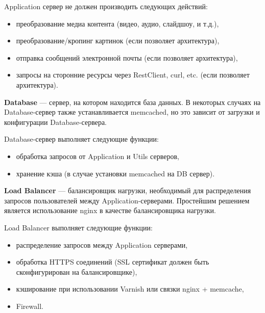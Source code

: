 \documentclass[10pt, a5paper]{article}
\begin{document}
Application сервер не должен производить следующих действий:
\begin{itemize}
\item преобразование медиа контента (видео, аудио, слайдшоу, и т.д.),
\item преобразование/кропинг картинок (если позволяет архитектура),
\item отправка сообщений электронной почты (если позволяет архитектура),
\item запросы на сторонние ресурсы через RestClient, curl, etc. (если позволяет архитектура).
\end{itemize}
{\bf Database} --- сервер, на котором находится база данных. В некоторых случаях на Database-сервер также устанавливается memcached, но это зависит от загрузки и конфигурации Database-сервера. 

Database-сервер выполняет следующие функции:
\begin{itemize}
\item обработка запросов от Application и Utils серверов,
\item хранение кэша (в случае установки memcached на DB сервер).
\end{itemize}
{\bf Load Balancer} --- балансировщик нагрузки, необходимый для распределения запросов пользователей между Application-серверами. Простейшим решением является использование nginx в качестве балансировщика нагрузки.

Load Balancer выполняет следующие функции:
\begin{itemize}
\item распределение запросов между Application серверами,
\item обработка HTTPS соединений (SSL сертификат должен быть сконфигурирован на балансировщике),
\item кэширование при использовании Varnish или связки nginx + memcache,
\item Firewall.
\end{itemize}
\end{document}

